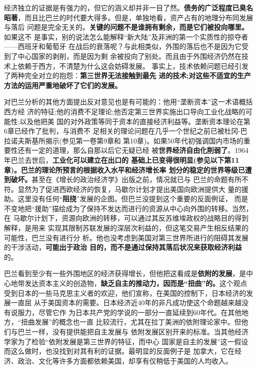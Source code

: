 经济独立的证据是有强力的，但它的涵义却并非一目了然。\textbf{债务的广泛程度已臭名
  昭著}，而且比巴兰的时代要大得多。但是，单独地看，资产占有的地理分布同发展与落后
问题是完全无关的。\textbf{关键的问题不是谁拥有剩余，而是它们被投向哪里。}如果这不
是事实，别的说法怎么能解释“新大陆”及非洲的第一个实质性的掠夺者——西班牙和葡萄牙
在战后的衰落呢？与此相类似，外围的落后也不是因为它受到了中心国家的剥削，而是因为剩
余被投向了别处。而且由于外围经济仍然在技术上依赖于西方，不清楚为什么这会妨碍发展。
事实上，技术依赖问题已经引发了两种完全对立的抱怨：\textbf{第三世界无法接触到最先
  进的技术;对这些不适宜的生产方法的运用严重地破坏了它们的发展。}

对巴兰分析的其他方面提出反对意见也是有可能的：他用“垄断资本”这一术语概括西方经
济的特征;他的消费不足理论;他否定第三世界实施出口导向工业化战略的可能性;以及他把美
国的对外政策等同于资本的直接经济利益等。垄断资本理论在第6章已经作了批判，与消费不
足相关的理论问题在几乎一个世纪之前已被杜冈-巴拉诺夫斯基所揭示(参见第一卷第9章和
第10章)。如果50年代初强调国内市场的重要性还有一定的道理，那么自那以后它无疑已经
被\textbf{世界经济自由化削弱了}。1964年巴兰去世后，\textbf{工业化可以建立在出口的
  基础上已变得很明显(参见以下第11章)。巴兰的理论所预言的根据收入水平和经济增长率
  划分的稳定的世界等级已遭到破坏。}甚至在《增长的政治经济学》出版之前，情况就已与
巴兰的命题有所不符。显然为了促进西欧经济的恢复，马歇尔计划才提出美国向欧洲提供大
量的援助。这里没有任何“\textbf{阻挠}”发展的企图。但巴兰没提到这个重要的反面例证，
而是不变地把“援助”描绘成为了保持不发达而进行的资源从中心向外围的转移。当然，在
马歇尔计划下，资源向欧洲的转移，可以通过其反苏维埃政权的战略目的得到解释，是用来
实现其限制苏联发展的深层次利益的，但这笔交易产生相反结果的可能性，巴兰没有进行分
析。他也没考虑到美国对第三世界所进行的阻碍其发展的干涉活动，\textbf{可能出于政治
  目的，而不是通过保持其落后状况来获取经济利益}的。

巴兰看到至少有一些外围地区的经济获得增长，但他把这看成是\textbf{依附的发展}，是中
心地带发达资本主义的创造物，\textbf{缺乏自主的推动力，因而是“扭曲”的。}这个观点
受到日本的一些马克思主义者的欢迎，他们宣称，在美国的控制下，日本经济的发展一直屈
从于美国资本的需要。日本经济近40年的非凡成功使这个命题越来越没有说服力，尽管它作
为日本共产党的学说的一部分一直延续到60年代。在其他地方，“扭曲发展”的概念也一直
比较流行，尤其在拉丁美洲的依附理论家中。但他们与巴兰一样，没有提供能把自主发展与
依附发展区别开来的标准。当其他经济学家为了检验“依附发展是第三世界的特征，而中心
国家是自主的发展”这一假设而这么做时，也没找到对其有利的证据。最明显的反面例子是
加拿大，它在经济、政治、文化等许多方面都依赖美国，却享有仅稍低于美国的人均收入。

